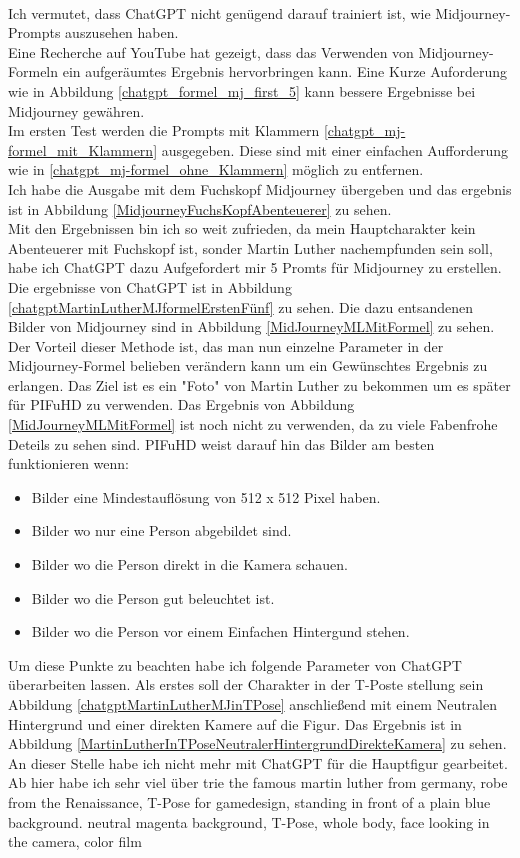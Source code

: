 \documentclass[10pt,a4paper,bibliography=totocnumbered,listof=totocnumbered]{scrartcl}
\begin{document}
\\
Ich vermutet, dass ChatGPT nicht genügend darauf trainiert ist, wie Midjourney-Prompts auszusehen haben.
\\
Eine Recherche auf YouTube hat gezeigt, dass das Verwenden von Midjourney-Formeln ein aufgeräumtes Ergebnis hervorbringen kann. Eine Kurze Auforderung wie in Abbildung \ref{chatgpt_formel_mj_first_5} kann bessere Ergebnisse bei Midjourney gewähren.
\\
Im ersten Test werden die Prompts mit Klammern \ref{chatgpt_mj-formel_mit_Klammern} ausgegeben. Diese sind mit einer einfachen Aufforderung wie in \ref{chatgpt_mj-formel_ohne_Klammern} möglich zu entfernen.
\\
Ich habe die Ausgabe mit dem Fuchskopf Midjourney übergeben und das ergebnis ist in Abbildung \ref{MidjourneyFuchsKopfAbenteuerer} zu sehen.
\\
Mit den Ergebnissen bin ich so weit zufrieden, da mein Hauptcharakter kein Abenteuerer mit Fuchskopf ist, sonder Martin Luther nachempfunden sein soll, habe ich ChatGPT dazu Aufgefordert mir 5 Promts für Midjourney zu erstellen. Die ergebnisse von ChatGPT ist in Abbildung \ref{chatgptMartinLutherMJformelErstenFünf} zu sehen. Die dazu entsandenen Bilder von Midjourney sind in Abbildung \ref{MidJourneyMLMitFormel} zu sehen.
\\
Der Vorteil dieser Methode ist, das man nun einzelne Parameter in der Midjourney-Formel belieben verändern kann um ein Gewünschtes Ergebnis zu erlangen. Das Ziel ist es ein "Foto" von Martin Luther zu bekommen um es später für PIFuHD zu verwenden. Das Ergebnis von Abbildung \ref{MidJourneyMLMitFormel} ist noch nicht zu verwenden, da zu viele Fabenfrohe Deteils zu sehen sind. PIFuHD weist darauf hin das Bilder am besten funktionieren wenn:
\begin{itemize}
	\item Bilder eine Mindestauflösung von 512 x 512 Pixel haben.
	\item Bilder wo nur eine Person abgebildet sind.
	\item Bilder wo die Person direkt in die Kamera schauen.
	\item Bilder wo die Person gut beleuchtet ist.
	\item Bilder wo die Person vor einem Einfachen Hintergund stehen.
\end{itemize}

Um diese Punkte zu beachten habe ich folgende Parameter von ChatGPT überarbeiten lassen. Als erstes soll der Charakter in der T-Poste stellung sein Abbildung \ref{chatgptMartinLutherMJinTPose} anschließend mit einem Neutralen Hintergrund und einer direkten Kamere auf die Figur. Das Ergebnis ist in Abbildung \ref{MartinLutherInTPoseNeutralerHintergrundDirekteKamera} zu sehen.
\\
An dieser Stelle habe ich nicht mehr mit ChatGPT für die Hauptfigur gearbeitet. Ab hier habe ich sehr viel über trie
the famous martin luther from germany, robe from the Renaissance, T-Pose for gamedesign, standing in front of a plain blue background. neutral magenta background, T-Pose, whole body, face looking in the camera, color film
\end{document}
